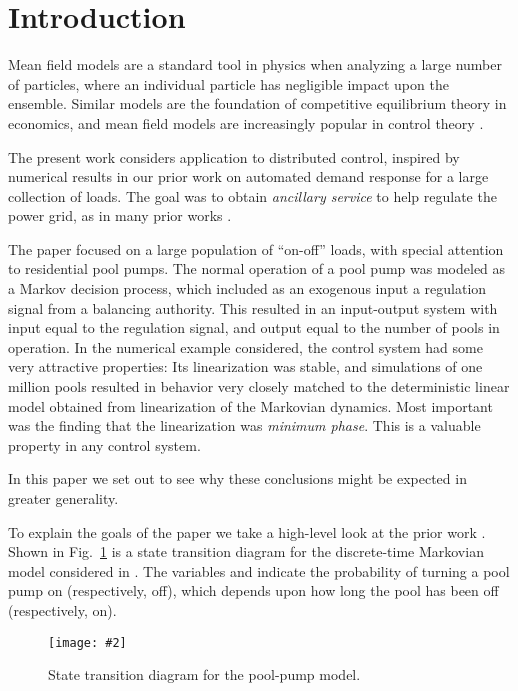 \documentclass[11pt,twocolumn]{IEEEtran}
\def\Ebox#1#2{\begin{center}
 \parbox{#1\hsize}{\epsfxsize=\hsize \epsfbox{#2}}
\end{center}}
\def\Ebox#1#2{\begin{center}    
\texttt{[image: \#2]}
\end{center}}
\def\Fig#1{Fig.~\ref{#1}}
\begin{document}
  
 


 

\section{Introduction}


Mean field models are a standard  tool in physics when analyzing a large number of particles, where an individual particle has negligible impact upon the ensemble.  Similar models are the foundation of competitive equilibrium theory in economics, and mean field models are increasingly popular in   control theory  \cite{huacaimal07,borsun12,gasgauleb12,guaragwil12}.

The present work considers application to distributed control, inspired by numerical results  in our prior work \cite{meybarbusyueehr14} on automated demand response for a large collection of loads.  The goal was to obtain \textit{ancillary service} to help regulate the power grid, as in many prior works \cite{coupertemdeb12,macalhis10}.   


The paper \cite{meybarbusyueehr14}  focused on a large population of ``on-off'' loads, with special attention to residential pool pumps.   The normal operation of a pool pump was modeled as a Markov decision process, which included as an exogenous input a regulation signal from a balancing authority.   This resulted in an input-output system with input equal to the regulation signal, and output equal to the number of pools in operation.  In the numerical example considered, the control system had some very attractive properties:  Its linearization was stable, and simulations of one million pools resulted in behavior very closely matched to the deterministic linear model obtained from linearization of the Markovian dynamics.  Most important was the finding that the linearization was \textit{minimum phase}.  This is a valuable property in any control system.  

In this paper we set out to see why these conclusions might be expected in greater generality.

To explain the goals of the paper we take a high-level look at the prior work \cite{meybarbusyueehr14}.
 Shown in \Fig{fig:pppDynamics} is a state transition diagram for the discrete-time Markovian model considered in \cite{meybarbusyueehr14}.  
 The variables   and 
indicate the probability of turning a pool pump on (respectively, off),  which depends upon how long the pool has been off (respectively, on).
 \begin{figure}[h]
\Ebox{.9}{pppDynamicsCSS.pdf} 
\vspace{-.25cm}
\caption{State transition diagram for the pool-pump model.
}
\label{fig:pppDynamics} 
\end{figure} 
\end{document}
